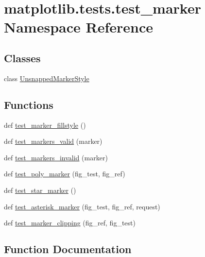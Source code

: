 \hypertarget{namespacematplotlib_1_1tests_1_1test__marker}{}\section{matplotlib.\+tests.\+test\+\_\+marker Namespace Reference}
\label{namespacematplotlib_1_1tests_1_1test__marker}
\subsection*{Classes}
\begin{DoxyCompactItemize}
\item 
class \hyperlink{classmatplotlib_1_1tests_1_1test__marker_1_1UnsnappedMarkerStyle}{Unsnapped\+Marker\+Style}
\end{DoxyCompactItemize}
\subsection*{Functions}
\begin{DoxyCompactItemize}
\item 
def \hyperlink{namespacematplotlib_1_1tests_1_1test__marker_affcad716fbcaea96456bf59225c317f6}{test\+\_\+marker\+\_\+fillstyle} ()
\item 
def \hyperlink{namespacematplotlib_1_1tests_1_1test__marker_a99ad4e9040173673c23a235064281af3}{test\+\_\+markers\+\_\+valid} (marker)
\item 
def \hyperlink{namespacematplotlib_1_1tests_1_1test__marker_ad452b4bf785fa125139ff82b1e668ee1}{test\+\_\+markers\+\_\+invalid} (marker)
\item 
def \hyperlink{namespacematplotlib_1_1tests_1_1test__marker_a4231658f82d6196981c5de8d2d8d4ae5}{test\+\_\+poly\+\_\+marker} (fig\+\_\+test, fig\+\_\+ref)
\item 
def \hyperlink{namespacematplotlib_1_1tests_1_1test__marker_a8a4b6c8cacde3a03884608f6e3261dd3}{test\+\_\+star\+\_\+marker} ()
\item 
def \hyperlink{namespacematplotlib_1_1tests_1_1test__marker_a51278b055868a49535d3e4690749bc77}{test\+\_\+asterisk\+\_\+marker} (fig\+\_\+test, fig\+\_\+ref, request)
\item 
def \hyperlink{namespacematplotlib_1_1tests_1_1test__marker_a42d655caac39a785ad820c8d9ea2c995}{test\+\_\+marker\+\_\+clipping} (fig\+\_\+ref, fig\+\_\+test)
\end{DoxyCompactItemize}


\subsection{Function Documentation}
\mbox{\label{namespacematplotlib_1_1tests_1_1test__marker_a51278b055868a49535d3e4690749bc77}} 
